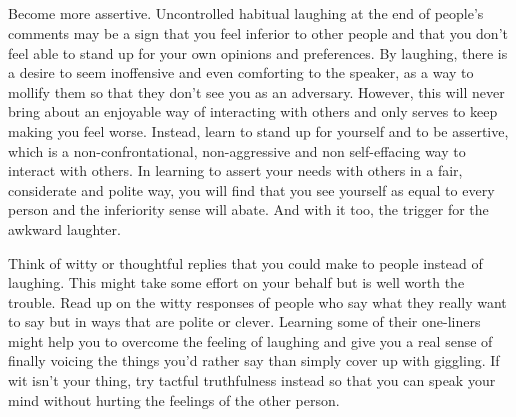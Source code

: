 \documentclass{article}
\begin{document}
\subsection{}
Become more assertive. Uncontrolled habitual laughing at the end of people's comments may be a sign that you feel inferior to other people and that you don't feel able to stand up for your own opinions and preferences. By laughing, there is a desire to seem inoffensive and even comforting to the speaker, as a way to mollify them so that they don't see you as an adversary. However, this will never bring about an enjoyable way of interacting with others and only serves to keep making you feel worse. Instead, learn to stand up for yourself and to be assertive, which is a non-confrontational, non-aggressive and non self-effacing way to interact with others. In learning to assert your needs with others in a fair, considerate and polite way, you will find that you see yourself as equal to every person and the inferiority sense will abate. And with it too, the trigger for the awkward laughter.

Think of witty or thoughtful replies that you could make to people instead of laughing. This might take some effort on your behalf but is well worth the trouble. Read up on the witty responses of people who say what they really want to say but in ways that are polite or clever. Learning some of their one-liners might help you to overcome the feeling of laughing and give you a real sense of finally voicing the things you'd rather say than simply cover up with giggling. If wit isn't your thing, try tactful truthfulness instead so that you can speak your mind without hurting the feelings of the other person.
\end{document}
